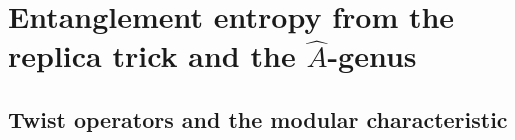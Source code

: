 %
%

\section{Entanglement entropy from the replica trick
and the \texorpdfstring{$\hat{A}$}{A-hat}-genus}
\label{sec:ent-replica-shadow}

\subsection{Twist operators and the modular characteristic}

